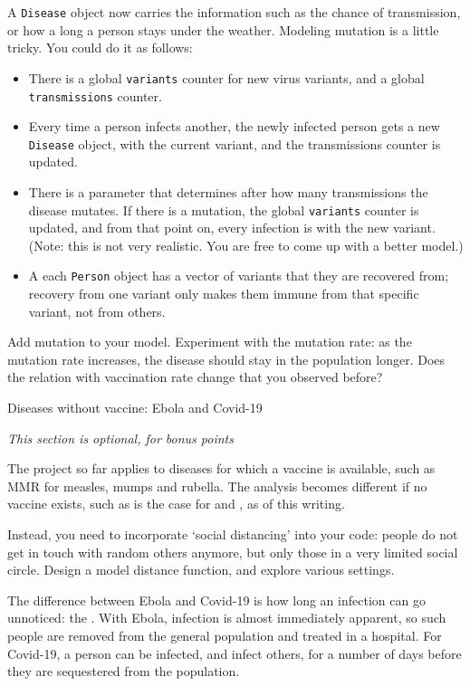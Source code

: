 A \lstinline{Disease} object now carries the information such as
the chance of transmission, or how a long a person stays under the weather.
Modeling mutation is a little tricky. You could do it as follows:
\begin{itemize}
\item There is a global \lstinline{variants} counter for new virus variants,
  and a global \lstinline{transmissions} counter.
\item Every time a person infects another, the newly infected person gets
  a new \lstinline{Disease} object, with the current variant,
  and the transmissions counter is updated.
\item There is a parameter that determines after how many transmissions the disease mutates.
  If there is a mutation, the global \lstinline{variants} counter is updated,
  and from that point on, every infection is with the new variant.
  (Note: this is not very realistic. You are free to come up with a better model.)
\item A each \lstinline{Person} object has a vector of variants that they are recovered from;
  recovery from one variant only makes them immune from that specific variant,
  not from others.
\end{itemize}

\begin{exercise}
  Add mutation to your model. Experiment with the mutation rate:
  as the mutation rate increases, the disease should stay in the population longer.
  Does the relation with vaccination rate change that you observed before?
\end{exercise}

 {Diseases without vaccine: Ebola and Covid-19}

\emph{This section is optional, for bonus points}

The project so far applies to diseases for which a vaccine is available,
such as MMR for measles, mumps and rubella.
The analysis becomes different if no vaccine exists, such
as is the case for  and ,
as of this writing.

Instead, you need to incorporate `social distancing' into your code:
people do not get in touch with random others anymore,
but only those in a very limited social circle.
Design a model distance function, and explore various settings.

The difference between Ebola and Covid-19 is how long an
infection can go unnoticed: the .
With Ebola, infection is almost
immediately apparent, so such people are removed from the
general population and treated in a hospital.
For Covid-19, a person can be infected, and infect others,
for a number of days before they are sequestered from the population.

